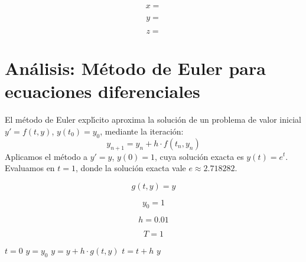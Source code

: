\documentclass{article}
\begin{document}
\begin{equation}
    x =
    \label{eq:res:x}
\end{equation}

\begin{equation}
    y =
    \label{eq:res:y}
\end{equation}

\begin{equation}
    z =
    \label{eq:res:z}
\end{equation}


\section{An\'alisis: M\'etodo de Euler para ecuaciones diferenciales}

El m\'etodo de Euler expl\'{\i}cito aproxima la soluci\'on de un problema de valor inicial
$y' = f(t, y)$, $y(t_0) = y_0$, mediante la iteraci\'on:
\[
    y_{n+1} = y_n + h \cdot f(t_n, y_n)
\]
Aplicamos el m\'etodo a $y' = y$, $y(0) = 1$, cuya soluci\'on exacta es $y(t) = e^t$.
Evaluamos en $t = 1$, donde la soluci\'on exacta vale $e \approx 2.718282$.

\begin{equation}
    g(t, y) = y
    \label{eq:calc:g}
\end{equation}

\begin{equation}
    y_0 = 1
    \label{eq:calc:y0}
\end{equation}

\begin{equation}
    h = 0.01
    \label{eq:calc:h}
\end{equation}

\begin{equation}
    T = 1
    \label{eq:calc:T}
\end{equation}

\begin{algorithm}
\caption{M\'etodo de Euler para $y' = y$, $y(0) = 1$}
\begin{algorithmic}
    \STATE $t = 0$
    \STATE $y = y_0$
        \STATE $y = y + h \cdot g(t, y)$
        \STATE $t = t + h$
    \ENDWHILE
    \RETURN $y$
\end{algorithmic}
\end{algorithm}
\end{document}
